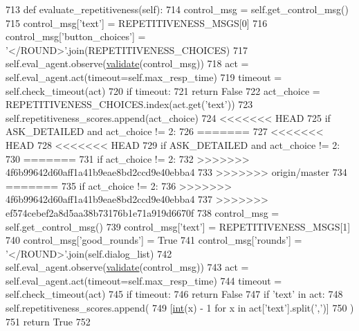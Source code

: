 \begin{DoxyCode}
713     \textcolor{keyword}{def }evaluate\_repetitiveness(self):
714         control\_msg = self.get\_control\_msg()
715         control\_msg[\textcolor{stringliteral}{'text'}] = REPETITIVENESS\_MSGS[0]
716         control\_msg[\textcolor{stringliteral}{'button\_choices'}] = \textcolor{stringliteral}{'</ROUND>'}.join(REPETITIVENESS\_CHOICES)
717         self.eval\_agent.observe(\hyperlink{namespaceparlai_1_1core_1_1worlds_afc3fad603b7bce41dbdc9cdc04a9c794}{validate}(control\_msg))
718         act = self.eval\_agent.act(timeout=self.max\_resp\_time)
719         timeout = self.check\_timeout(act)
720         \textcolor{keywordflow}{if} timeout:
721             \textcolor{keywordflow}{return} \textcolor{keyword}{False}
722         act\_choice = REPETITIVENESS\_CHOICES.index(act.get(\textcolor{stringliteral}{'text'}))
723         self.repetitiveness\_scores.append(act\_choice)
724 <<<<<<< HEAD
725         \textcolor{keywordflow}{if} ASK\_DETAILED \textcolor{keywordflow}{and} act\_choice != 2:
726 =======
727 <<<<<<< HEAD
728 <<<<<<< HEAD
729         \textcolor{keywordflow}{if} ASK\_DETAILED \textcolor{keywordflow}{and} act\_choice != 2:
730 =======
731         \textcolor{keywordflow}{if} act\_choice != 2:
732 >>>>>>> 4f6b99642d60aff1a41b9eae8bd2ccd9e40ebba4
733 >>>>>>> origin/master
734 =======
735         \textcolor{keywordflow}{if} act\_choice != 2:
736 >>>>>>> 4f6b99642d60aff1a41b9eae8bd2ccd9e40ebba4
737 >>>>>>> ef574cebef2a8d5aa38b73176b1e71a919d6670f
738             control\_msg = self.get\_control\_msg()
739             control\_msg[\textcolor{stringliteral}{'text'}] = REPETITIVENESS\_MSGS[1]
740             control\_msg[\textcolor{stringliteral}{'good\_rounds'}] = \textcolor{keyword}{True}
741             control\_msg[\textcolor{stringliteral}{'rounds'}] = \textcolor{stringliteral}{'</ROUND>'}.join(self.dialog\_list)
742             self.eval\_agent.observe(\hyperlink{namespaceparlai_1_1core_1_1worlds_afc3fad603b7bce41dbdc9cdc04a9c794}{validate}(control\_msg))
743             act = self.eval\_agent.act(timeout=self.max\_resp\_time)
744             timeout = self.check\_timeout(act)
745             \textcolor{keywordflow}{if} timeout:
746                 \textcolor{keywordflow}{return} \textcolor{keyword}{False}
747             \textcolor{keywordflow}{if} \textcolor{stringliteral}{'text'} \textcolor{keywordflow}{in} act:
748                 self.repetitiveness\_scores.append(
749                     [\hyperlink{namespacelanguage__model_1_1eval__ppl_a7d12ee00479673c5c8d1f6d01faa272a}{int}(x) - 1 \textcolor{keywordflow}{for} x \textcolor{keywordflow}{in} act[\textcolor{stringliteral}{'text'}].split(\textcolor{stringliteral}{','})]
750                 )
751         \textcolor{keywordflow}{return} \textcolor{keyword}{True}
752 
\end{DoxyCode}
